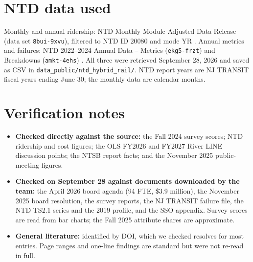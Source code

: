 \documentclass[11pt]{article}
\begin{document}



\appendix
\section{NTD data used}
Monthly and annual ridership: NTD Monthly Module Adjusted Data Release (data set \texttt{8bui-9xvu}), filtered to NTD ID 20080 and mode YR \citep{ntd_monthly}. Annual metrics and failures: NTD 2022--2024 Annual Data -- Metrics (\texttt{ekg5-frzt}) and Breakdowns (\texttt{amkt-4ehs}) \citep{ntd_metrics2224,ntd_breakdowns2224}. All three were retrieved September 28, 2026 and saved as CSV in \texttt{data\_public/ntd\_hybrid\_rail/}. NTD report years are NJ TRANSIT fiscal years ending June 30; the monthly data are calendar months.

\section{Verification notes}
\begin{itemize}
\item \textbf{Checked directly against the source:} the Fall 2024 survey scores; NTD ridership and cost figures; the OLS FY2026 and FY2027 River LINE discussion points; the NTSB report facts; and the November 2025 public-meeting figures.
\item \textbf{Checked on September 28 against documents downloaded by the team:} the April 2026 board agenda (94 FTE, \$3.9 million), the November 2025 board resolution, the survey reports, the NJ TRANSIT failure file, the NTD TS2.1 series and the 2019 profile, and the SSO appendix. Survey scores are read from bar charts; the Fall 2025 attribute shares are approximate.
\item \textbf{General literature:} identified by DOI, which we checked resolves for most entries. Page ranges and one-line findings are standard but were not re-read in full.
\end{itemize}
\end{document}
